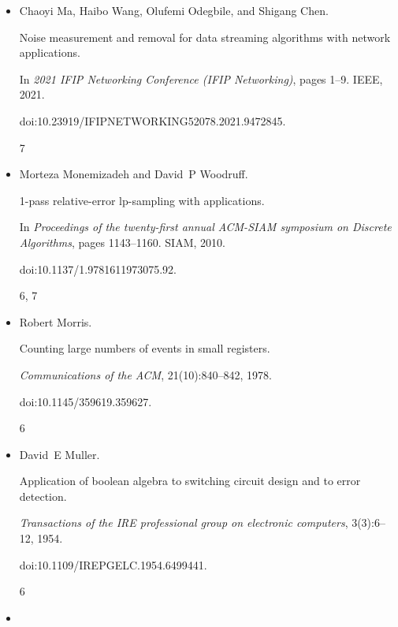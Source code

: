 \begin{itemize}
In \emph{60th Annual Symposium on Foundations of Computer Science
(FOCS)}, 2019.


6




\item[] 
[21]

Chaoyi Ma, Haibo Wang, Olufemi Odegbile, and Shigang Chen.


Noise measurement and removal for data streaming algorithms with
network applications.


In \emph{2021 IFIP Networking Conference (IFIP Networking)}, pages
1–9. IEEE, 2021.


doi:10.23919/IFIPNETWORKING52078.2021.9472845.


7




\item[] 
[22]

Morteza Monemizadeh and David P Woodruff.


1-pass relative-error lp-sampling with applications.


In \emph{Proceedings of the twenty-first annual ACM-SIAM symposium on
Discrete Algorithms}, pages 1143–1160. SIAM, 2010.


doi:10.1137/1.9781611973075.92.


6, 7




\item[] 
[23]

Robert Morris.


Counting large numbers of events in small registers.


\emph{Communications of the ACM}, 21(10):840–842, 1978.


doi:10.1145/359619.359627.


6




\item[] 
[24]

David E Muller.


Application of boolean algebra to switching circuit design and to
error detection.


\emph{Transactions of the IRE professional group on electronic
computers}, 3(3):6–12, 1954.


doi:10.1109/IREPGELC.1954.6499441.


6




\item[] 
[25]


\end{itemize}
